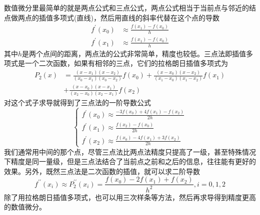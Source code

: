 \documentclass[12pt,a4paper,openany,twoside]{book}
\numberwithin{equation}{section}
\begin{document}
            数值微分里最简单的就是两点公式和三点公式，两点公式相当于当前点与邻近的结点做两点的插值多项式(直线)，然后用直线的斜率代替在这个点的导数
            \begin{equation}
              \begin{aligned}
                f^{\prime}\left(x_{0}\right) & \approx \frac{f\left(x_{1}\right)-f\left(x_{0}\right)}{h} \\
                f^{\prime}\left(x_{1}\right) & \approx \frac{f\left(x_{1}\right)-f\left(x_{0}\right)}{h}
              \end{aligned}
            \end{equation}
            其中$h$是两个点间的距离，两点法的公式非常简单，精度也较低。三点法即插值多项式是一个二次函数，如果有相邻的三点，它们的拉格朗日插值多项式为
            \begin{equation*}
              \begin{aligned}
                P_{2}(x) &=\frac{\left(x-x_{1}\right)\left(x-x_{2}\right)}{\left(x_{0}-x_{1}\right)\left(x_{0}-x_{2}\right)} f\left(x_{0}\right)+\frac{\left(x-x_{0}\right)\left(x-x_{2}\right)}{\left(x_{1}-x_{0}\right)\left(x_{1}-x_{2}\right)} f\left(x_{1}\right) \\
                &+\frac{\left(x-x_{0}\right)\left(x-x_{1}\right)}{\left(x_{2}-x_{0}\right)\left(x_{2}-x_{1}\right)} f\left(x_{2}\right)
              \end{aligned}
            \end{equation*}
            对这个式子求导就得到了三点法的一阶导数公式
            \begin{equation}
              \left\{\begin{array}{l}
                {f^{\prime}\left(x_{0}\right) \approx \frac{-3 f\left(x_{0}\right)+4 f\left(x_{1}\right)-f\left(x_{2}\right)}{2 h}} \\
                {f^{\prime}\left(x_{1}\right) \approx \frac{f\left(x_{2}\right)-f\left(x_{0}\right)}{2 h}} \\
                {f^{\prime}\left(x_{2}\right) \approx \frac{f\left(x_{0}\right)-4 f\left(x_{1}\right)+3 f\left(x_{2}\right)}{2 h}}
              \end{array}\right.
            \end{equation}
            我们通常用中间的那个点，尽管三点法比两点法精度只提高了一级，甚至特殊情况下精度是同一量级，但是三点法结合了当前点之前和之后的信息，往往能有更好的效果。另外，既然三点法是二次函数的插值，就可以求二阶导数
            \begin{equation}
              f^{\prime \prime}\left(x_{i}\right) \approx P_{2}^{\prime \prime}\left(x_{i}\right)=\frac{f\left(x_{0}\right)-2 f\left(x_{1}\right)+f\left(x_{2}\right)}{h^{2}}, i=0,1,2
            \end{equation}
            除了用拉格朗日插值多项式，也可以用三次样条等方法，然后再求导得到精度更高的数值微分。
\end{document}
